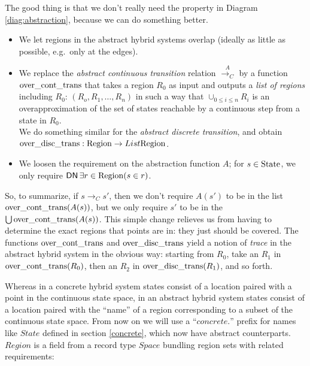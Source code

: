 \documentclass[runningheads]{llncs}
\newcommand{\Conid}[1]{\mathit{#1}}
\newcommand{\Varid}[1]{\mathit{#1}}
\renewcommand{\leq}{\leqslant}
\newcommand{\DN}{{\sf DN}\,}
\newcommand{\State}{{\rm State}}
\newcommand{\Region}{{\rm Region}}
\newcommand{\contrans}{\rightarrow_C}
\newcommand{\acontrans}{\stackrel{A}{\rightarrow_C}}
\newcommand{\overcontrans}{{\rm over\_cont\_trans}}
\newcommand{\overdistrans}{{\rm over\_disc\_trans}}
\begin{document}
The good thing is that we don't really need the property in Diagram
\ref{diag:abstraction}, because we can do something better. 
\begin{itemize}
\item
We let regions in the abstract hybrid systems overlap (ideally as
little as possible, e.g.\ only at the edges).

\item
We replace the {\em abstract continuous transition\/} relation
$\acontrans$ by a function $\overcontrans$ that takes a region $R_0$
as input and outputs a {\em list of regions\/} including $R_0$: $(R_o,
R_1, \ldots, R_n)$ in such a way that $\cup_{0\leq i\leq n}R_i$ is an
overapproximation of the set of states reachable by a continuous step
from a state in $R_0$.\\
We do something similar for the {\em abstract discrete transition}, and obtain $\overdistrans :\Region \rightarrow List \Region$.
\item
We loosen the requirement on the abstraction function $A$; for $s \in \State$, we only require $\DN {\exists r\in \Region}{(s\in r)}$.
\end{itemize}

So, to summarize, if $s\contrans s'$, then we don't require
$A(s')$ to be in the list $\overcontrans(A(s))$, but we only require
$s'$ to be in the $\bigcup \overcontrans(A(s))$. 
This simple change relieves us from having to determine the exact
regions that points are in: they just should be covered. The functions
$\overcontrans$ and $\overdistrans$ yield a notion of {\em trace\/} in
the abstract hybrid system in the obvious way: starting from $R_0$,
take an $R_1$ in $\overcontrans( R_0)$, then an $R_2$ in
$\overdistrans(R_1)$, and so forth.

Whereas in a concrete hybrid system states consist of a location
paired with a point in the continuous state space, in an abstract
hybrid system states consist of a location paired with the ``name'' of
a region corresponding to a subset of the continuous state space.
From now on we will use a ``\ensuremath{\Varid{concrete}.}'' prefix for names like
\ensuremath{\Conid{State}} defined in section \ref{concrete}, which now have abstract
counterparts. \ensuremath{\Conid{Region}} is a field from a record type \ensuremath{\Conid{Space}} bundling
region sets with related requirements:
\end{document}
